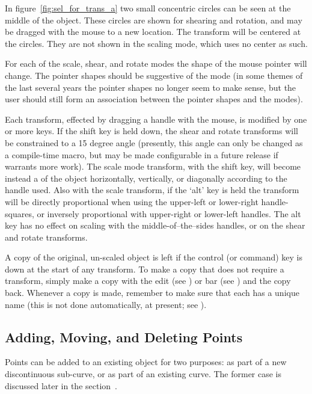 		In figure~\ref{fig:sel_for_trans_a}
		two small concentric circles can be seen at the
		middle of the object. These circles are shown for
		shearing and rotation, and may be dragged with the
		mouse to a new location.
		The transform will be centered at the circles.
		They are not shown in the scaling mode, which uses no
		center as such.
		
		For each of the
		scale, shear, and rotate modes the shape of the
		mouse pointer will change. The pointer shapes
		should be suggestive of the mode (in some
		 themes of the last several years the
		pointer shapes no longer seem to make sense, but the
		user should still form an association between the
		pointer shapes and the modes).
		
		Each transform, effected by dragging a handle with the
		mouse, is modified by one or more keys.	If the shift
		key is held down, the shear and rotate transforms
		will be constrained to a 15 degree angle (presently,
		this angle can only be changed as a compile-time
		macro, but may be made configurable
		in a future release if \IXpkg{} warrants more work).
		The scale mode transform, with the shift key, will become
		instead a  of the object horizontally,
		vertically, or diagonally according to the handle
		used. Also with the scale transform, if the `alt'
		key is held the transform will be directly proportional
		when using the upper-left or lower-right handle-squares,
		or inversely proportional with upper-right or
		lower-left handles. The alt key has no effect on
		scaling with the middle-of--the--sides handles, or on
		the shear and rotate transforms.
		
		A copy of the original, un-scaled object is left
		if the control (or command) key is down
		at the start of any transform. To make a copy that
		does not require a transform, simply make a
		 copy with the edit 
		(see ) or  bar
		(see ) and
		 the copy back. Whenever a copy is
		made, remember to make sure that each has a unique
		name (this is not done automatically, at present;
		see ).
		
		\subsection{Adding, Moving, and Deleting Points}%
		\label{ssec:add_del_points}
		Points can be added to an existing object
		for two purposes:
		as part of a new discontinuous sub-curve, or as
		part of an existing curve. The former case is
		discussed later in the
		section~.
		
